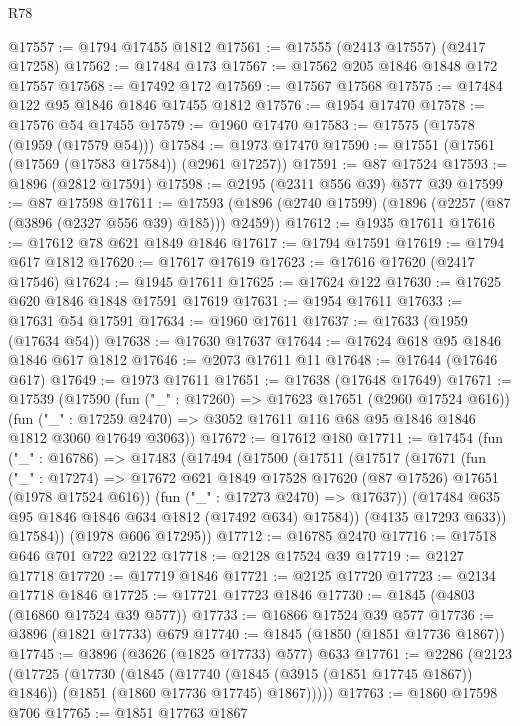 \begin{lexlean}{R78}
\begin{coremodule}
@17557 := @1794 @17455 @1812
@17561 := @17555 (@2413 @17557) (@2417 @17258)
@17562 := @17484 @173
@17567 := @17562 @205 @1846 @1848 @172 @17557
@17568 := @17492 @172
@17569 := @17567 @17568
@17575 := @17484 @122 @95 @1846 @1846 @17455 @1812
@17576 := @1954 @17470
@17578 := @17576 @54 @17455
@17579 := @1960 @17470
@17583 := @17575 (@17578 (@1959 (@17579 @54)))
@17584 := @1973 @17470
@17590 := @17551 (@17561 (@17569 (@17583 @17584)) (@2961 @17257))
@17591 := @87 @17524
@17593 := @1896 (@2812 @17591)
@17598 := @2195 (@2311 @556 @39) @577 @39
@17599 := @87 @17598
@17611 := @17593 (@1896 (@2740 @17599) (@1896 (@2257 (@87 (@3896 (@2327 @556 @39) @185))) @2459))
@17612 := @1935 @17611
@17616 := @17612 @78 @621 @1849 @1846
@17617 := @1794 @17591
@17619 := @1794 @617 @1812
@17620 := @17617 @17619
@17623 := @17616 @17620 (@2417 @17546)
@17624 := @1945 @17611
@17625 := @17624 @122
@17630 := @17625 @620 @1846 @1848 @17591 @17619
@17631 := @1954 @17611
@17633 := @17631 @54 @17591
@17634 := @1960 @17611
@17637 := @17633 (@1959 (@17634 @54))
@17638 := @17630 @17637
@17644 := @17624 @618 @95 @1846 @1846 @617 @1812
@17646 := @2073 @17611 @11
@17648 := @17644 (@17646 @617)
@17649 := @1973 @17611
@17651 := @17638 (@17648 @17649)
@17671 := @17539
    (@17590
      (fun ("_" : @17260) => @17623 @17651 (@2960 @17524 @616))
      (fun ("_" : @17259 @2470) => @3052 @17611 @116 @68 @95 @1846 @1846 @1812 @3060 @17649 @3063))
@17672 := @17612 @180
@17711 := @17454
    (fun ("_" : @16786) =>
    @17483
      (@17494
        (@17500
          (@17511
            (@17517
              (@17671
                (fun ("_" : @17274) =>
                @17672 @621 @1849 @17528 @17620 (@87 @17526) @17651 (@1978 @17524 @616))
                (fun ("_" : @17273 @2470) => @17637))
              (@17484 @635 @95 @1846 @1846 @634 @1812 (@17492 @634) @17584))
            (@4135 @17293 @633))
          @17584))
      (@1978 @606 @17295))
@17712 := @16785 @2470
@17716 := @17518 @646 @701 @722 @2122
@17718 := @2128 @17524 @39
@17719 := @2127 @17718
@17720 := @17719 @1846
@17721 := @2125 @17720
@17723 := @2134 @17718 @1846
@17725 := @17721 @17723 @1846
@17730 := @1845 (@4803 (@16860 @17524 @39 @577))
@17733 := @16866 @17524 @39 @577
@17736 := @3896 (@1821 @17733) @679
@17740 := @1845 (@1850 (@1851 @17736 @1867))
@17745 := @3896 (@3626 (@1825 @17733) @577) @633
@17761 := @2286
    (@2123
      (@17725
        (@17730
          (@1845
            (@17740 (@1845 (@3915 (@1851 @17745 @1867)) @1846))
            (@1851 (@1860 @17736 @17745) @1867)))))
@17763 := @1860 @17598 @706
@17765 := @1851 @17763 @1867

\end{coremodule}
\end{lexlean}

